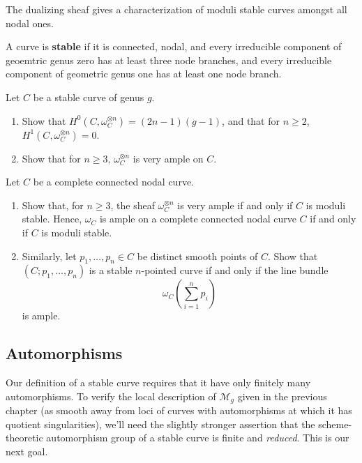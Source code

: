 \documentclass[12pt]{article}
\begin{document}
The dualizing sheaf gives a characterization of moduli stable curves amongst all nodal ones.
\begin{definition}
    A curve is \textbf{stable} if it is connected, nodal, and every irreducible component of geoemtric genus zero has at least three node branches, and every irreducible component of geometric genus one has at least one node branch. 
\end{definition}
\begin{exercise}
    Let \( C \) be a stable curve of genus \( g \).
    \begin{enumerate}
        \item Show that \( H^0(C, \omega_C^{\otimes n}) = (2n - 1)(g - 1) \), and that for \( n \geq 2 \), \( H^1(C, \omega_C^{\otimes n}) = 0 \).
        \item Show that for \( n \geq 3 \), \( \omega_C^{\otimes n} \) is very ample on \( C \).
    \end{enumerate}
    \end{exercise}
    
    \begin{exercise}
    Let \( C \) be a complete connected nodal curve.
    \begin{enumerate}
        \item Show that, for \( n \geq 3 \), the sheaf \( \omega_C^{\otimes n} \) is very ample if and only if \( C \) is moduli stable. Hence, \( \omega_C \) is ample on a complete connected nodal curve \( C \) if and only if \( C \) is moduli stable.
        \item Similarly, let \( p_1, \ldots, p_n \in C \) be distinct smooth points of \( C \). Show that \( (C; p_1, \ldots, p_n) \) is a stable \( n \)-pointed curve if and only if the line bundle
        \[
        \omega_C\left( \sum_{i=1}^n p_i \right)
        \]
        is ample.
    \end{enumerate}
    \end{exercise}

\subsection{Automorphisms}

Our definition of a stable curve requires that it have only finitely many automorphisms. To verify the local description of \(\mathcal{M}_g\) given in the previous chapter (as smooth away from loci of curves with automorphisms at which it has quotient singularities), we'll need the slightly stronger assertion that the scheme-theoretic automorphism group of a stable curve is finite and \emph{reduced}. This is our next goal.
\end{document}

